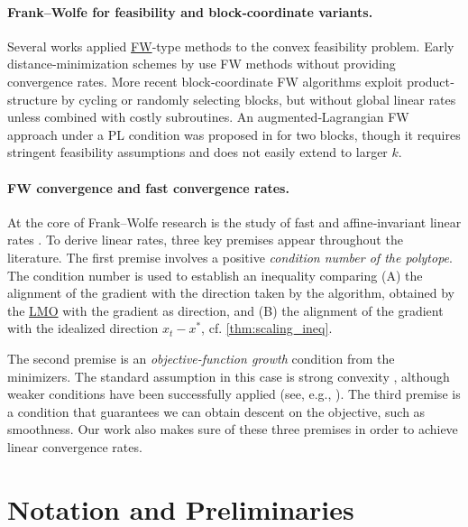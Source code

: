 \documentclass{article}
\newcommand\newlink[2]{\hyperlink{#1}{\normalcolor #2}}
\newcommand{\FW}{\newlink{def:acronym_frank_wolfe}{FW}}
\newcommand{\LMO}{\newlink{def:acronym_linear_minimization_oracle}{LMO}}
\begin{document}
\paragraph{Frank–Wolfe for feasibility and block‐coordinate variants.}
Several works applied \FW{}‐type methods to the convex feasibility problem. Early distance‐minimization schemes by \citet{Wil68,Wol76} use FW methods without providing convergence rates. More recent block‐coordinate FW algorithms \cite{BPS15,BRZ23} exploit product‐structure by cycling or randomly selecting blocks, but without global linear rates unless combined with costly subroutines. An augmented‐Lagrangian FW approach under a PL condition was proposed in \cite{GPL18} for two blocks, though it requires stringent feasibility assumptions and does not easily extend to larger $k$.

\paragraph{FW convergence and fast convergence rates.}
At the core of Frank–Wolfe research is the study of fast \cite{garber2015faster,KDP20,wirth2023acceleration,wirth2025accelerated} and affine‐invariant linear rates \cite{LJ15,TTP22,pena2023affine,wirth2024fast}. To derive linear rates, three key premises \cite{PR18} appear throughout the literature.
%
The first premise involves a positive \emph{condition number of the polytope}.
The condition number is used to establish an inequality comparing (A) the alignment of the gradient with the direction taken by the algorithm, obtained by the \LMO{} with the gradient as direction, and (B) the alignment of the gradient with the idealized direction $x_t - x^\ast$, cf. \cref{thm:scaling_ineq}.
%

The second premise is an \emph{objective-function growth} condition from the minimizers.
The standard assumption in this case is strong convexity \cite{GM86,LJ15,GH15,TTP22}, although weaker conditions have been successfully applied (see, e.g., \cite{BS15,LJ15,wirth2024fast}).
The third premise is a condition that guarantees we can obtain descent on the objective, such as smoothness. Our work also makes sure of these three premises in order to achieve linear convergence rates.
%
%
%
%
%
%
%
%
%
%
%
%
%
%
%
%
%
%
%
%
\section{Notation and Preliminaries}\label{s:preliminaries}
\end{document}
